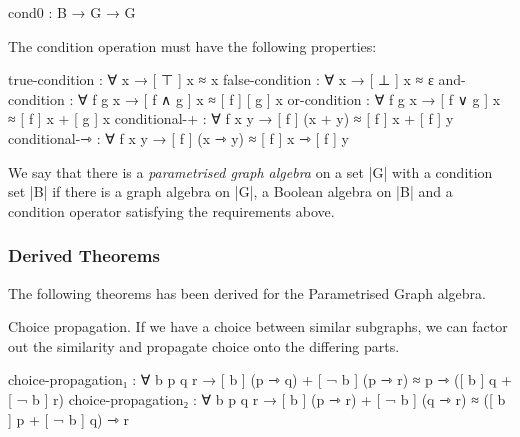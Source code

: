 \begin{code}
cond0 : B → G → G
\end{code}

The condition operation must have the following properties:


\begin{code}
  true-condition : ∀ x → [ ⊤ ] x ≈ x
  false-condition : ∀ x → [ ⊥ ] x ≈ ε
  and-condition : ∀ f g x → [ f ∧ g ] x ≈ [ f ] [ g ]  x
  or-condition : ∀ f g x → [ f ∨ g ] x ≈ [ f ] x + [ g ]  x
  conditional-+ : ∀ f x y → [ f ] (x + y) ≈ [ f ] x + [ f ] y
  conditional-⇾ : ∀ f x y → [ f ] (x ⇾ y) ≈ [ f ] x ⇾ [ f ] y
\end{code}

We say that there is a \emph{parametrised graph algebra} on a set |G| with a condition set |B|
if there is a graph algebra on |G|, a Boolean algebra on |B| and a condition operator satisfying the requirements above.

\subsubsection{Derived Theorems}

The following theorems has been derived for the Parametrised Graph algebra.


Choice propagation. If we have a choice between similar subgraphs, we can factor out the similarity and propagate choice onto the differing parts.
\begin{code}
choice-propagation₁ : ∀ b p q r → 
    [ b ] (p ⇾ q) + [ ¬ b ] (p ⇾ r) ≈ p ⇾ ([ b ] q + [ ¬ b ] r) 
choice-propagation₂ : ∀ b p q r → 
    [ b ] (p ⇾ r) + [ ¬ b ] (q ⇾ r) ≈ ([ b ] p + [ ¬ b ] q) ⇾ r
\end{code}


